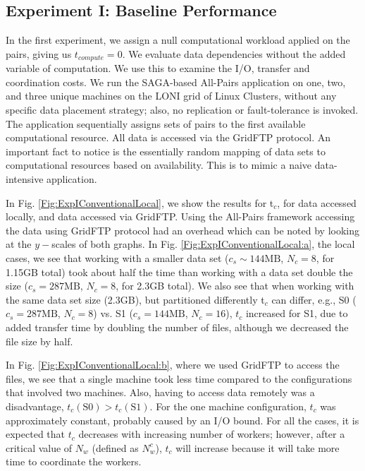 \documentclass{rspublic}
\begin{document}
\vspace{-0.4cm}

\subsection{Experiment I: Baseline Performance}\label{Sec:gridFTPExp}

\vspace{-0.1cm}

In the first experiment, we assign a null computational workload
applied on the pairs, giving us $t_{compute}=0$. We evaluate data
dependencies without the added variable of computation. We use this to
examine the I/O, transfer and coordination costs. We run the
SAGA-based All-Pairs application on one, two, and three unique
machines on the LONI grid of Linux Clusters, without any specific data
placement strategy; also, no replication or fault-tolerance is
invoked.  The application sequentially assigns sets of pairs to the
first available computational resource. All data is accessed via the
GridFTP protocol. An important fact to notice is the essentially
random mapping of data sets to computational resources based on
availability. This is to mimic a naive data-intensive application.

In Fig. \ref{Fig:ExpIConventionalLocal}, we show the results for
t$_c$, for
data accessed locally, and data accessed via
GridFTP. Using the All-Pairs framework accessing the data using
GridFTP protocol had an overhead which can be noted by looking at the
$y-$scales of both graphs. In Fig.
\ref{Fig:ExpIConventionalLocal:a}, the local cases, we see that
working with a smaller data set ($c_s \sim 144\mbox{MB}$, $N_c = 8$, for 1.15GB
total) took about half the time than working with a data set double
the size ($c_s = 287\mbox{MB}$, $N_c = 8$, for 2.3GB total). We also see that
when working with the same data set size (2.3GB), but partitioned
differently t$_c$ can differ, e.g., S0 ($c_s = 287\mbox{MB}$, $N_c = 8$) vs. S1 ($c_s =
144\mbox{MB}$, $N_c = 16$), $t_c$ increased for S1, due to added transfer
time by doubling the number of files, although we decreased the file
size by half. 

In Fig. \ref{Fig:ExpIConventionalLocal:b}, where we
used GridFTP to access the files, we see that a single machine took
less time compared to the configurations that involved two
machines. Also, having to access data remotely was a disadvantage,
$t_c(\mbox{S0}) > t_c(\mbox{S1})$. For the one machine configuration,
$t_c$ was approximately constant, probably caused by an I/O bound. For
all the cases, it is expected that $t_c$ decreases with increasing
number of workers; however, after a critical value of $N_w$ (defined
as $N^c_w$), $t_c$ will increase because it will take more time to
coordinate the workers.
\end{document}
